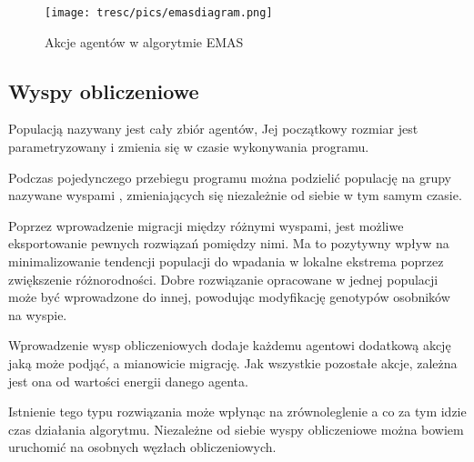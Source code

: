 \begin{figure}[H]
\begin{center} 
\texttt{[image: tresc/pics/emasdiagram.png]}
\caption{Akcje agentów w algorytmie EMAS}
\label{fig:emasdiagram}
\end{center}
\end{figure}

\subsection{Wyspy obliczeniowe}
Populacją nazywany jest cały zbiór agentów, Jej początkowy rozmiar jest parametryzowany i zmienia się w czasie wykonywania programu.

Podczas pojedynczego przebiegu programu można podzielić populację na grupy nazywane wyspami \cite{emas3}, zmieniających się niezależnie od siebie w tym samym czasie. 

Poprzez wprowadzenie migracji między różnymi wyspami, jest możliwe eksportowanie pewnych rozwiązań pomiędzy nimi. Ma to pozytywny wpływ na minimalizowanie tendencji populacji do wpadania w lokalne ekstrema poprzez zwiększenie różnorodności. Dobre rozwiązanie opracowane w jednej populacji może być wprowadzone do innej, powodując modyfikację genotypów osobników na wyspie. 

Wprowadzenie wysp obliczeniowych dodaje każdemu agentowi dodatkową akcję jaką może podjąć, a mianowicie migrację. Jak wszystkie pozostałe akcje, zależna jest ona od wartości energii danego agenta.

Istnienie tego typu rozwiązania może wpłynąc na zrównoleglenie a co za tym idzie czas działania algorytmu. Niezależne od siebie wyspy obliczeniowe można bowiem uruchomić na osobnych węzłach obliczeniowych.



